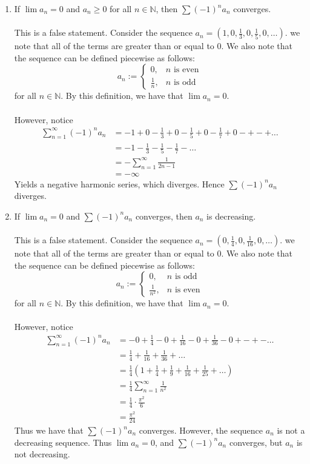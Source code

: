 \documentclass[12pt,letterpaper]{article}
\newcommand{\N}{\mathbb{N}}
\theoremstyle{case}
\theoremstyle{definition}
\begin{document}
\begin{enumerate}
\begin{enumerate}
			\item If $\lim a_n=0$ and $a_n \geq 0$ for all $n \in \N$, then $\sum (-1)^n a_n$ converges.
			\\\\This is a false statement. Consider the sequence $a_n=(1,0,\frac{1}{3},0,\frac{1}{5},0,\dots)$. we note that all of the terms are greater than or equal to 0. We also note that the sequence can be defined piecewise as follows:
			\[a_n:=\begin{cases}
			0, &n\text{ is even} \\
			\frac{1}{n}, &n\text{ is odd}
			\end{cases}\]
			for all $n \in \N$. By this definition, we have that $\lim a_n=0$.
			\\\\However, notice 
			\begin{align*}
				\sum_{n=1}^{\infty}(-1)^n a_n &= -1 + 0 -\frac{1}{3}+0-\frac{1}{5}+0-\frac{1}{7}+0-+-+\dots \\
				&= -1-\frac{1}{3}-\frac{1}{5}-\frac{1}{7}-\dots \\
				&= -\sum_{n=1}^{\infty} \frac{1}{2n-1} \\
				&= -\infty
			\end{align*}
			Yields a negative harmonic series, which diverges. Hence $\sum (-1)^na_n$ diverges. \\
			
			\item If $\lim a_n=0$ and $\sum (-1)^n a_n$ converges, then $a_n$ is decreasing.
			\\\\This is a false statement. Consider the sequence $a_n=(0,\frac{1}{4},0,\frac{1}{16},0,\dots)$. we note that all of the terms are greater than or equal to 0. We also note that the sequence can be defined piecewise as follows:
			\[a_n:=\begin{cases}
			0, &n\text{ is odd} \\
			\frac{1}{n^2}, &n\text{ is even}
			\end{cases}\]
			for all $n \in \N$. By this definition, we have that $\lim a_n=0$.
			\\\\However, notice 
			\begin{align*}
			\sum_{n=1}^{\infty}(-1)^n a_n &= -0 +\frac{1}{4}-0+\frac{1}{16}-0+\frac{1}{36}-0+-+-\dots \\
			&= \frac{1}{4}+\frac{1}{16}+\frac{1}{36}+\dots \\
			&= \frac{1}{4} \left(1+\frac{1}{4}+\frac{1}{9}+\frac{1}{16}+\frac{1}{25}+\dots\right) \\
			&= \frac{1}{4} \sum_{n=1}^{\infty} \frac{1}{n^2} \\
			&= \frac{1}{4} \cdot \frac{\pi^2}{6} \\
			&= \frac{\pi^2}{24}
			\end{align*}
			Thus we have that $\sum (-1)^na_n$ converges. However, the sequence $a_n$ is not a decreasing sequence. Thus $\lim a_n=0$, and $\sum (-1)^na_n$ converges, but $a_n$ is not decreasing.
			

\end{enumerate}
\end{enumerate}
\end{document}
